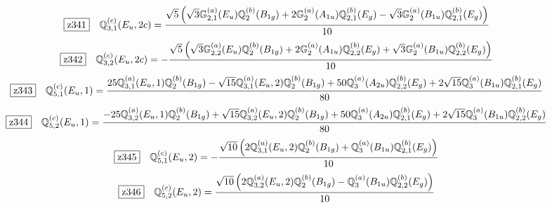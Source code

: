 \documentclass[fleqn,10pt,landscape]{jsarticle}
\begin{document}
\begin{dmath*}
\hspace*{3mm}\fbox{z341}\quad \mathbb{Q}_{3,1}^{(c)}(E_{u},2c)=\frac{\sqrt{5} \left(\sqrt{3} \mathbb{G}_{2,1}^{(a)}(E_{u}) \mathbb{Q}_{2}^{(b)}(B_{1g}) + 2 \mathbb{G}_{2}^{(a)}(A_{1u}) \mathbb{Q}_{2,1}^{(b)}(E_{g}) - \sqrt{3} \mathbb{G}_{2}^{(a)}(B_{1u}) \mathbb{Q}_{2,1}^{(b)}(E_{g})\right)}{10}
\end{dmath*}
\begin{dmath*}
\hspace*{3mm}\fbox{z342}\quad \mathbb{Q}_{3,2}^{(c)}(E_{u},2c)=- \frac{\sqrt{5} \left(\sqrt{3} \mathbb{G}_{2,2}^{(a)}(E_{u}) \mathbb{Q}_{2}^{(b)}(B_{1g}) + 2 \mathbb{G}_{2}^{(a)}(A_{1u}) \mathbb{Q}_{2,2}^{(b)}(E_{g}) + \sqrt{3} \mathbb{G}_{2}^{(a)}(B_{1u}) \mathbb{Q}_{2,2}^{(b)}(E_{g})\right)}{10}
\end{dmath*}
\begin{dmath*}
\hspace*{3mm}\fbox{z343}\quad \mathbb{Q}_{5,1}^{(c)}(E_{u},1)=\frac{25 \mathbb{Q}_{3,1}^{(a)}(E_{u},1) \mathbb{Q}_{2}^{(b)}(B_{1g}) - \sqrt{15} \mathbb{Q}_{3,1}^{(a)}(E_{u},2) \mathbb{Q}_{2}^{(b)}(B_{1g}) + 50 \mathbb{Q}_{3}^{(a)}(A_{2u}) \mathbb{Q}_{2,2}^{(b)}(E_{g}) + 2 \sqrt{15} \mathbb{Q}_{3}^{(a)}(B_{1u}) \mathbb{Q}_{2,1}^{(b)}(E_{g})}{80}
\end{dmath*}
\begin{dmath*}
\hspace*{3mm}\fbox{z344}\quad \mathbb{Q}_{5,2}^{(c)}(E_{u},1)=\frac{- 25 \mathbb{Q}_{3,2}^{(a)}(E_{u},1) \mathbb{Q}_{2}^{(b)}(B_{1g}) + \sqrt{15} \mathbb{Q}_{3,2}^{(a)}(E_{u},2) \mathbb{Q}_{2}^{(b)}(B_{1g}) + 50 \mathbb{Q}_{3}^{(a)}(A_{2u}) \mathbb{Q}_{2,1}^{(b)}(E_{g}) + 2 \sqrt{15} \mathbb{Q}_{3}^{(a)}(B_{1u}) \mathbb{Q}_{2,2}^{(b)}(E_{g})}{80}
\end{dmath*}
\begin{dmath*}
\hspace*{3mm}\fbox{z345}\quad \mathbb{Q}_{5,1}^{(c)}(E_{u},2)=- \frac{\sqrt{10} \left(2 \mathbb{Q}_{3,1}^{(a)}(E_{u},2) \mathbb{Q}_{2}^{(b)}(B_{1g}) + \mathbb{Q}_{3}^{(a)}(B_{1u}) \mathbb{Q}_{2,1}^{(b)}(E_{g})\right)}{10}
\end{dmath*}
\begin{dmath*}
\hspace*{3mm}\fbox{z346}\quad \mathbb{Q}_{5,2}^{(c)}(E_{u},2)=\frac{\sqrt{10} \left(2 \mathbb{Q}_{3,2}^{(a)}(E_{u},2) \mathbb{Q}_{2}^{(b)}(B_{1g}) - \mathbb{Q}_{3}^{(a)}(B_{1u}) \mathbb{Q}_{2,2}^{(b)}(E_{g})\right)}{10}
\end{dmath*}
\end{document}
